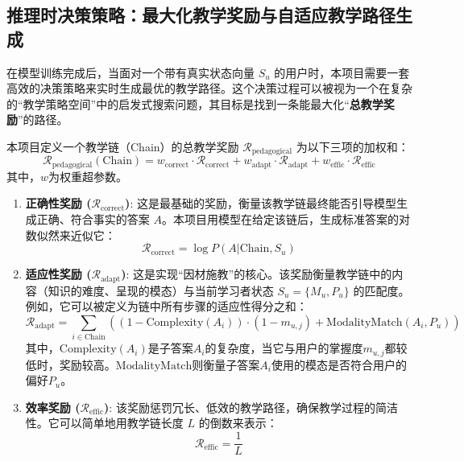 \subsection{推理时决策策略：最大化教学奖励与自适应教学路径生成}
在模型训练完成后，当面对一个带有真实状态向量 $S_u$ 的用户时，本项目需要一套高效的决策策略来实时生成最优的教学路径。这个决策过程可以被视为一个在复杂的“教学策略空间”中的启发式搜索问题，其目标是找到一条能最大化“\textbf{总教学奖励}”的路径。

本项目定义一个教学链（Chain）的总教学奖励 $\mathcal{R}_{\text{pedagogical}}$ 为以下三项的加权和：
\begin{equation}
\mathcal{R}_{\text{pedagogical}}(\text{Chain}) = w_{\text{correct}} \cdot \mathcal{R}_{\text{correct}} + w_{\text{adapt}} \cdot \mathcal{R}_{\text{adapt}} + w_{\text{effic}} \cdot \mathcal{R}_{\text{effic}}
\end{equation}
其中，$w$为权重超参数。

\begin{enumerate}
    \item \textbf{正确性奖励 ($\mathcal{R}_{\text{correct}}$)}: 这是最基础的奖励，衡量该教学链最终能否引导模型生成正确、符合事实的答案 $A$。本项目用模型在给定该链后，生成标准答案的对数似然来近似它：
    \begin{equation}
        \mathcal{R}_{\text{correct}} = \log P(A | \text{Chain}, S_u)
    \end{equation}
    
    \item \textbf{适应性奖励 ($\mathcal{R}_{\text{adapt}}$)}: 这是实现“因材施教”的核心。该奖励衡量教学链中的内容（知识的难度、呈现的模态）与当前学习者状态 $S_u = \{M_u, P_u\}$ 的匹配度。例如，它可以被定义为链中所有步骤的适应性得分之和：
    \begin{equation}
        \mathcal{R}_{\text{adapt}} = \sum_{i \in \text{Chain}} \left( (1 - \text{Complexity}(A_i)) \cdot (1 - m_{u,j}) + \text{ModalityMatch}(A_i, P_u) \right)
    \end{equation}
    其中，$\text{Complexity}(A_i)$是子答案$A_i$的复杂度，当它与用户的掌握度$m_{u,j}$都较低时，奖励较高。$\text{ModalityMatch}$则衡量子答案$A_i$使用的模态是否符合用户的偏好$P_u$。
    
    \item \textbf{效率奖励 ($\mathcal{R}_{\text{effic}}$)}: 该奖励惩罚冗长、低效的教学路径，确保教学过程的简洁性。它可以简单地用教学链长度 $L$ 的倒数来表示：
    \begin{equation}
        \mathcal{R}_{\text{effic}} = \frac{1}{L}
    \end{equation}
\end{enumerate}

